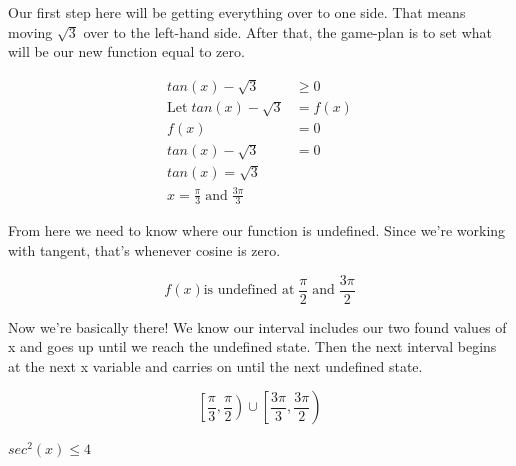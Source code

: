 \documentclass[10pt,letterpaper]{amspset}
\begin{document}
\begin{solution}
    Our first step here will be getting everything over to one side. That means moving $\sqrt{3}$ over to the left-hand side. After that, the game-plan is to set what will be our new function equal to zero. 
    
    \begin{align}
        tan(x) - \sqrt{3} &\geq 0 \\
        \text{Let} \; tan(x) - \sqrt{3} &= f(x) \\
        f(x) &= 0 \\
        tan(x) - \sqrt{3} &= 0 \\
        tan(x) = \sqrt{3} \\
        x = \frac{\pi}{3} \; \text{and} \; \frac{3\pi}{3}
    \end{align}

    From here we need to know where our function is undefined. Since we're working with tangent, that's whenever cosine is zero. 
    
    \[f(x) \text{is undefined at} \; \frac{\pi}{2} \; \text{and} \; \frac{3\pi}{2}\]
    
    Now we're basically there! We know our interval includes our two found values of x and goes up until we reach the undefined state. Then the next interval begins at the next x variable and carries on until the next undefined state.
    
    \[\boxed{ \left[ \frac{\pi}{3}, \frac{\pi}{2} \right) \cup \left[ \frac{3\pi}{3}, \frac{3\pi}{2} \right)  }\]
\end{solution}


\pagebreak


\begin{problem}[71]
    $sec^2(x) \leq 4$
\end{problem}
\end{document}
